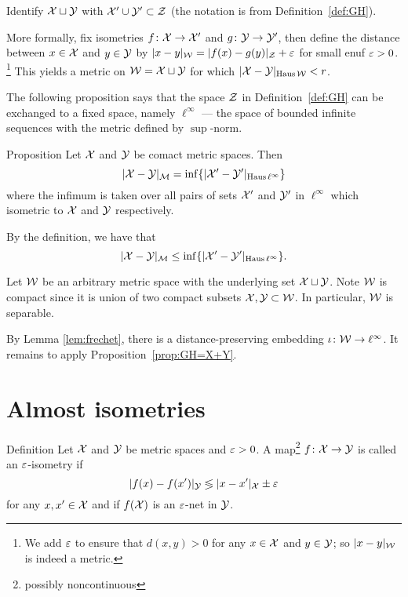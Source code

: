 Identify $\mathcal{X}\sqcup \mathcal{Y}$ with $\mathcal{X}'\cup \mathcal{Y}' \subset \mathcal{Z}$ 
(the notation
is from Definition~\ref{def:GH}). 

More formally, fix isometries $f\colon \mathcal{X} \to \mathcal{X}'$ and
$g\colon \mathcal{Y} \to \mathcal{Y}'$, then define the distance between $x \in \mathcal{X}$ and $y \in \mathcal{Y}$ by
$|x-y|_{\spc{W}} = |f (x)\z- g(y)|_{\spc{Z}}+\eps$ for small enuf $\varepsilon>0$.%
\footnote{We add $\varepsilon$ to ensure that $d(x, y) > 0$ for any $x\in \mathcal{X}$ and $y\in \mathcal{Y}$;
so $|x-y|_{\mathcal{W}}$ is indeed a metric.}
This yields a metric on $\mathcal{W}=\mathcal{X}\sqcup \mathcal{Y}$ for which
$|\spc{X}- \spc{Y}|_{\Haus\spc{W}} \z< r$.
\qeds

The following proposition says that the space $\mathcal{Z}$ in Definition~\ref{def:GH} can be exchanged to a fixed space, namely $\ell^\infty$ --- the space of bounded infinite sequences with the metric defined by $\sup$-norm.

\begin{thm}{Proposition}\label{prop:GH-with-fixed-Z}
Let $\mathcal{X}$ and $\mathcal{Y}$ be comact metric spaces.
Then
$$|\mathcal{X}-\mathcal{Y}|_{\mathcal{M}} = \inf \{|\mathcal{X}'-\mathcal{Y}'|_{\operatorname{\rm Haus}\nolimits\ell^\infty}\}$$ 
where the infimum is taken over all pairs of sets $\mathcal{X}'$ and $\mathcal{Y}'$ in $\ell^\infty$
which isometric to  $\mathcal{X}$ and $\mathcal{Y}$ respectively.  
\end{thm}




By the definition, we have that 
\[|\mathcal{X}-\mathcal{Y}|_{\mathcal{M}} \leq \inf \{|\mathcal{X}'-\mathcal{Y}'|_{\operatorname{\rm Haus}\nolimits\ell^\infty}\}.\]

Let $\mathcal{W}$ be an arbitrary metric space with the underlying set $\mathcal{X}\sqcup \mathcal{Y}$.
Note $\mathcal{W}$ is compact since it is union of two compact subsets $\mathcal{X},\mathcal{Y}\subset \mathcal{W}$.
In particular, $\mathcal{W}$ is separable.

By Lemma \ref{lem:frechet}, there is a distance-preserving embedding $\iota\:\spc{W}\z\to \ell^\infty$.
It remains to apply Proposition~\ref{prop:GH=X+Y}.
\qeds



\section{Almost isometries}\label{sec:alm-isom}

\begin{thm}{Definition} Let $\mathcal{X}$ and $\mathcal{Y}$ be metric spaces and $\varepsilon > 0$. 
A  map\footnote{possibly noncontinuous} $f\: \spc{X} \z\to \spc{Y}$ is called an $\varepsilon$-isometry 
if 
$$|f(x)-f(x')|_{\mathcal{Y}}\lessgtr |x-x'|_{\mathcal{X}}\pm\varepsilon$$
for any $x,x'\in \mathcal{X}$ 
and if $f(\mathcal{X})$ is an $\varepsilon$-net in $\mathcal{Y}$.
\end{thm}

